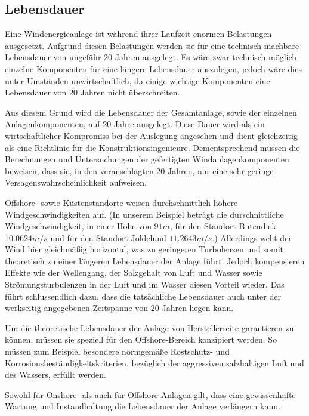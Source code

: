 \documentclass[a4paper,12pt]{article}
\begin{document}
	\subsection{Lebensdauer}
	Eine Windenergieanlage ist während ihrer Laufzeit enormen Belastungen ausgesetzt. Aufgrund diesen Belastungen werden sie für eine technisch machbare Lebensdauer von ungefähr 20 Jahren ausgelegt.\newline
	Es wäre zwar technisch möglich einzelne Komponenten für eine längere Lebensdauer auszulegen, jedoch wäre dies unter Umständen unwirtschaftlich, da einige wichtige Komponenten eine Lebensdauer von 20 Jahren nicht überschreiten.\\ \par
	\noindent Aus diesem Grund wird die Lebensdauer der Gesamtanlage, sowie der einzelnen Anlagenkomponenten, auf 20 Jahre ausgelegt. Diese Dauer wird als ein wirtschaftlicher Kompromiss bei der Auslegung angesehen und dient gleichzeitig als eine Richtlinie für die Konstruktionsingenieure. Dementsprechend müssen die Berechnungen und Untersuchungen der gefertigten Windanlagenkomponenten beweisen, dass sie, in den veranschlagten 20 Jahren, nur eine sehr geringe Versagenswahrscheinlichkeit aufweisen.\\ \par
	\noindent Offshore- sowie Küstenstandorte weisen durchschnittlich höhere Windgeschwindigkeiten auf. (In unserem Beispiel beträgt die durschnittliche Windgeschwindigkeit, in einer Höhe von $91m$, für den Standort Butendiek $10.0624m/s$ und für den Standort Joldelund $11.2643m/s$.) Allerdings weht der Wind hier gleichmäßig horizontal, was zu geringeren Turbolenzen und somit theoretisch zu einer längeren Lebensdauer der Anlage führt. Jedoch kompensieren Effekte wie der Wellengang, der Salzgehalt von Luft und Wasser sowie Strömungsturbulenzen in der Luft und im Wasser diesen Vorteil wieder. Das führt schlussendlich dazu, dass die tatsächliche Lebensdauer auch unter der werkseitig angegebenen Zeitspanne von 20 Jahren liegen kann.\\ \par
	\noindent Um die theoretische Lebensdauer der Anlage von Herstellerseite garantieren zu können, müssen sie speziell für den Offshore-Bereich konzipiert werden. So müssen zum Beispiel besondere normgemäße Rostschutz- und Korrosionsbeständigkeitskriterien, bezüglich der aggressiven salzhaltigen Luft und des Wassers, erfüllt werden.\\ \par
	\noindent Sowohl für Onshore- als auch für Offshore-Anlagen gilt, dass eine gewissenhafte Wartung und Instandhaltung die Lebensdauer der Anlage verlängern kann.
	\newpage
\end{document}
